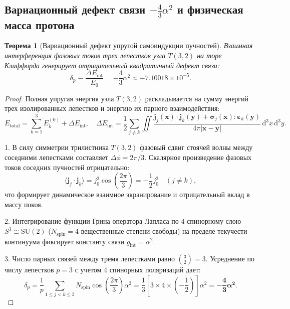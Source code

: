 \documentclass[11pt,a4paper]{article}
\newtheorem{theorem}{Теорема}[section]
\theoremstyle{definition}
\theoremstyle{remark}
\begin{document}
\subsection{Вариационный дефект связи $-\frac{4}{3}\alpha^2$ и физическая масса протона}
\begin{theorem}[Вариационный дефект упругой самоиндукции пучностей]
Взаимная интерференция фазовых токов трех лепестков узла $T(3,2)$ на торе Клиффорда генерирует отрицательный квадратичный дефект связи:
\begin{equation}
    \delta_p \equiv \frac{\Delta E_{\mathrm{int}}}{E_0} = -\frac{4}{3}\alpha^2 \approx -7.10018 \times 10^{-5}.
    \label{eq:proton_defect}
\end{equation}
\end{theorem}

\begin{proof}
Полная упругая энергия узла $T(3,2)$ раскладывается на сумму энергий трех изолированных лепестков и энергию их парного взаимодействия:
\begin{equation}
    E_{\mathrm{total}} = \sum_{k=1}^3 E_k^{(0)} + \Delta E_{\mathrm{int}}, \quad \Delta E_{\mathrm{int}} = \frac{1}{2} \sum_{j \ne k} \iint \frac{\mathbf{j}_j(\mathbf{x}) \cdot \mathbf{j}_k(\mathbf{y}) + \boldsymbol{\sigma}_j(\mathbf{x}) : \boldsymbol{\varepsilon}_k(\mathbf{y})}{4\pi |\mathbf{x} - \mathbf{y}|} \, \mathrm{d}^3 x \, \mathrm{d}^3 y.
\end{equation}

1. В силу симметрии трилистника $T(3,2)$ фазовый сдвиг стоячей волны между соседними лепестками составляет $\Delta \phi = 2\pi/3$. Скалярное произведение фазовых токов соседних пучностей отрицательно:
\begin{equation}
    \langle \mathbf{j}_j \cdot \mathbf{j}_k \rangle = j_0^2 \cos\left(\frac{2\pi}{3}\right) = -\frac{1}{2} j_0^2 \quad (j \ne k),
\end{equation}
что формирует динамическое взаимное экранирование и отрицательный вклад в массу покоя.

2. Интегрирование функции Грина оператора Лапласа по 4-спинорному слою $S^3 \cong \mathrm{SU}(2)$ ($N_{\mathrm{spin}} = 4$ вещественные степени свободы) на пределе текучести континуума фиксирует константу связи $g_{\mathrm{int}} = \alpha^2$.

3. Число парных связей между тремя лепестками равно $\binom{3}{2} = 3$. Усреднение по числу лепестков $p=3$ с учетом 4 спинорных поляризаций дает:
\begin{equation}
    \delta_p = \frac{1}{p} \sum_{1 \le j < k \le 3} N_{\mathrm{spin}} \cos\left(\frac{2\pi}{3}\right) \alpha^2 = \frac{1}{3} \left[ 3 \times 4 \times \left(-\frac{1}{2}\right) \right] \alpha^2 = \boldsymbol{-\frac{4}{3}\alpha^2}.
\end{equation}
\end{proof}
\end{document}
